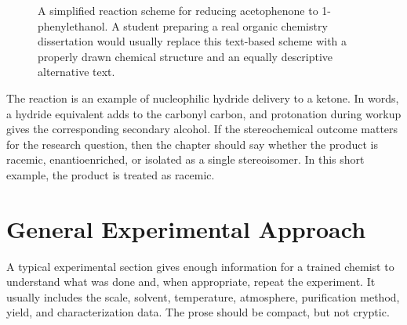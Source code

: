 \begin{figure}[htbp]
\centering
{}
\caption{A simplified reaction scheme for reducing acetophenone to 1-phenylethanol. A student preparing a real organic chemistry dissertation would usually replace this text-based scheme with a properly drawn chemical structure and an equally descriptive alternative text.}
\label{fig:model-reduction-scheme}
\end{figure}

The reaction is an example of nucleophilic hydride delivery to a ketone. In words, a hydride equivalent adds to the carbonyl carbon, and protonation during workup gives the corresponding secondary alcohol. If the stereochemical outcome matters for the research question, then the chapter should say whether the product is racemic, enantioenriched, or isolated as a single stereoisomer. In this short example, the product is treated as racemic.

\section{General Experimental Approach}
\label{sec:general-experimental-approach}

A typical experimental section gives enough information for a trained chemist to understand what was done and, when appropriate, repeat the experiment. It usually includes the scale, solvent, temperature, atmosphere, purification method, yield, and characterization data. The prose should be compact, but not cryptic.

